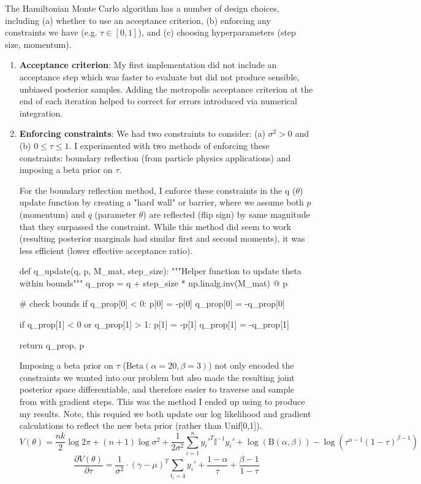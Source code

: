 \documentclass[12pt,letterpaper,twoside]{article}
\begin{document}
The Hamiltonian Monte Carlo algorithm has a number of design 
choices, including (a) whether to use an acceptance criterion, 
(b) enforcing any constraints we have (e.g. $\tau \in [0,1]$), 
and (c) choosing hyperparameters (step size, momentum).

\begin{enumerate}[label=(\alph*)]
\item \textbf{Acceptance criterion}: My first implementation did not 
include an acceptance step which was faster to evaluate but did 
not produce sensible, unbiased posterior samples. Adding the 
metropolis acceptance criterion at the end of each iteration 
helped to correct for errors introduced via numerical 
integration.

\item \textbf{Enforcing constraints}: We had two constraints to consider: 
(a) $\sigma^2 > 0$ and (b) $0 \le \tau \le 1$. I experimented with 
two methods of enforcing these constraints: boundary reflection (from 
particle physics applications) and imposing a beta prior on $\tau$.

For the boundary reflection method, I enforce these 
constraints in the q ($\theta$) update function by creating a 
"hard wall" or barrier, where we assume both $p$ (momentum) and 
$q$ (parameter $\theta$) are reflected (flip sign) by same magnitude 
that they surpassed the constraint. While this method did seem to work 
(resulting posterior marginals had similar first and second moments), it 
was less efficient (lower effective acceptance ratio).  

\begin{python}
def q_update(q, p, M_mat, step_size):
    """Helper function to update theta within bounds"""
    q_prop = q + step_size * np.linalg.inv(M_mat) @ p

    # check bounds
    if q_prop[0] < 0:
        p[0] = -p[0]
        q_prop[0] = -q_prop[0]

    if q_prop[1] < 0 or q_prop[1] > 1:
        p[1] = -p[1]
        q_prop[1] = -q_prop[1]

    return q_prop, p
\end{python}

Imposing a beta prior on $\tau$ ($\text{Beta}(\alpha=20,\beta=3)$) not only encoded the 
constraints we wanted into our problem but also made the resulting joint 
posterior space differentiable, and therefore easier to traverse and sample 
from with gradient steps. This was the method I ended up using to produce my 
results. Note, this requied we both update our log likelihood and gradient 
calculations to reflect the new beta prior (rather than Unif[0,1]).
$$ V(\theta) = \frac{nk}{2} \log 2\pi + (n+1) \log \sigma^2 + \frac{1}{2\sigma^2} \sum_{i=1}^n y_i'^T \mathbb{I}^{-1} y_i' + \log({\text{B}(\alpha, \beta)}) - \log(\tau^{\alpha-1}(1-\tau)^{\beta-1}) $$
$$ \frac{\partial V(\theta)}{\partial \tau} = \frac{1}{\sigma^2} \cdot (\gamma - \mu)^T \sum_{t_i=4} y_i' + \frac{1-\alpha}{\tau} + \frac{\beta -1}{1-\tau} $$ 


\end{enumerate}
\end{document}
